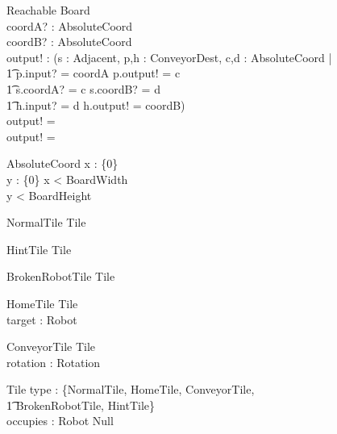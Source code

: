 \documentclass[12pt]{article}
\begin{document}
\begin{schema}{Reachable}
\Xi Board \\
coordA? : AbsoluteCoord \\
coordB? : AbsoluteCoord \\
output! : \bool
\where
\IF (\exists s : Adjacent, p,h : ConveyorDest, c,d : AbsoluteCoord | \\ \t1 
    p.input? = coordA \wedge p.output! = c \\ \t1
    s.coordA? = c \wedge s.coordB? = d \\ \t1
    h.input? = d \wedge h.output! = coordB) \\
\THEN output! = \true \\
\ELSE output! = \false
\end{schema}

\begin{schema}{AbsoluteCoord}
x : \nat \cup \{0\} \\
y : \nat \cup \{0\}
\where
x < BoardWidth \\
y < BoardHeight
\end{schema}


\begin{schema}{NormalTile}
Tile
\end{schema}

\begin{schema}{HintTile}
Tile
\end{schema}

\begin{schema}{BrokenRobotTile}
Tile
\end{schema}

\begin{schema}{HomeTile}
Tile \\
target : Robot
\end{schema}

\begin{schema}{ConveyorTile}
Tile \\
rotation : Rotation
\end{schema}

\begin{schema}{Tile}
type : \{NormalTile, HomeTile, ConveyorTile, \\ \t1 BrokenRobotTile, HintTile\} \\
occupies : Robot \cup Null
\end{schema}
\end{document}
